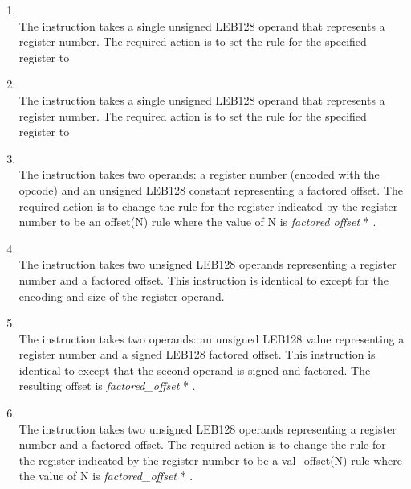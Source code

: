 \begin{enumerate}[1. ]

\item \textbf{\DWCFAundefinedTARG} \\
The \DWCFAundefinedTARG{} instruction takes a single unsigned
LEB128 operand that represents a register number. The required
action is to set the rule for the specified register to

\item \textbf{\DWCFAsamevalueTARG} \\
The \DWCFAsamevalueTARG{} instruction takes a single unsigned
LEB128 operand that represents a register number. The required
action is to set the rule for the specified register to

\item \textbf{\DWCFAoffsetTARG} \\
The \DWCFAoffsetTARG{} instruction takes two operands: a register
number (encoded with the opcode) and an unsigned LEB128
constant representing a factored offset. The required action
is to change the rule for the register indicated by the
register number to be an offset(N) rule where the value of
N is 
\textit{factored offset} * .

\item \textbf{\DWCFAoffsetextendedTARG} \\
The \DWCFAoffsetextendedTARG{} 
instruction takes two unsigned LEB128 
operands representing a register number and a factored
offset. This instruction is identical to
\DWCFAoffset{} 
except for the encoding and size of the register operand.

\item \textbf{\DWCFAoffsetextendedsfTARG} \\
The \DWCFAoffsetextendedsfTARG{} 
instruction takes two operands:
an unsigned LEB128 
value representing a register number and a
signed LEB128 factored offset. This instruction is identical
to \DWCFAoffsetextended{} 
except that the second operand is
signed and factored. The resulting offset is 
\textit{factored\_offset} * .

\item \textbf{\DWCFAvaloffsetTARG} \\
The \DWCFAvaloffsetTARG{} 
instruction takes two unsigned
LEB128 operands representing a register number and a
factored offset. The required action is to change the rule
for the register indicated by the register number to be a
val\_offset(N) rule where the value of N is 
\textit{factored\_offset} * .


\end{enumerate}

